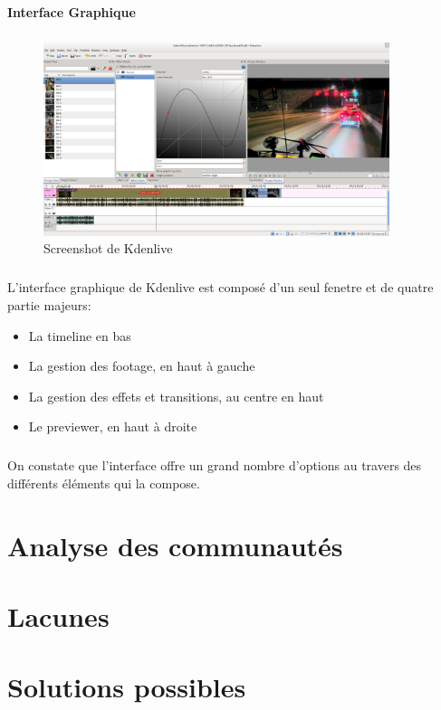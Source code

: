 \paragraph {Interface Graphique}

\subparagraph{}

\begin{figure}[H]

  \begin{center}

    \includegraphics[width=0.90\textwidth]{images/kdenlive}

  \end{center}

  \caption{Screenshot de Kdenlive}

  \label{Yes}

\end{figure}

\subparagraph{}

L'interface graphique de Kdenlive est composé d'un seul fenetre et de quatre partie majeurs:

\begin{itemize}
  \item {La timeline en bas}
  \item {La gestion des footage, en haut à gauche}
  \item {La gestion des effets et transitions, au centre en haut}
  \item {Le previewer, en haut à droite}
\end{itemize}

\subparagraph{}

On constate que l'interface offre un grand nombre d'options au travers des différents éléments
qui la compose.

\newpage \section{Analyse des communautés}

\newpage \section{Lacunes}

\newpage \section{Solutions possibles}
